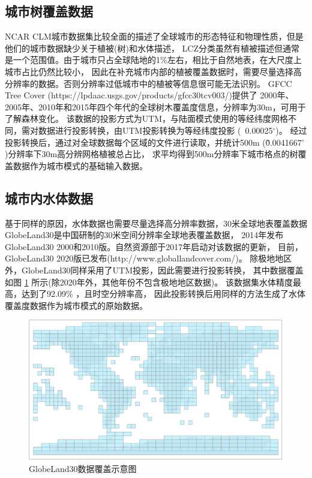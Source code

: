 \subsection{城市树覆盖数据}\label{城市树覆盖数据}
NCAR CLM城市数据集比较全面的描述了全球城市的形态特征和物理性质，但是他们的城市数据缺少关于植被(树)和水体描述，
LCZ分类虽然有植被描述但通常是一个范围值。由于城市只占全球陆地的1\%左右，相比于自然地表，在大尺度上城市占比仍然比较小，
因此在补充城市内部的植被覆盖数据时，需要尽量选择高分辨率的数据。否则分辨率过低城市中的植被等信息很可能无法识别。
GFCC Tree Cover (https://lpdaac.usgs.gov/products/gfcc30tcv003/)提供了
2000年、2005年、2010年和2015年四个年代的全球树木覆盖度信息，分辨率为30m，可用于了解森林变化。
该数据的投影方式为UTM，与陆面模式使用的等经纬度网格不同，需对数据进行投影转换，由UTM投影转换为等经纬度投影 (~0.00025$^\circ$)。
经过投影转换后，通过对全球数据每个区域的文件进行读取，并统计500m (\~0.0041667$^\circ$)分辨率下30m高分辨网格植被总占比，
求平均得到500m分辨率下城市格点的树覆盖数据作为城市模式的基础输入数据。
\subsection{城市内水体数据}\label{城市内水体数据}
基于同样的原因，水体数据也需要尽量选择高分辨率数据，30米全球地表覆盖数据GlobeLand30是中国研制的30米空间分辨率全球地表覆盖数据，
2014年发布GlobeLand30 2000和2010版。自然资源部于2017年启动对该数据的更新，
目前，GlobeLand30 2020版已发布(http://www.globallandcover.com/)。
除极地地区外，GlobeLand30同样采用了UTM投影，因此需要进行投影转换，
其中数据覆盖如图 \ref{fig:GlobeLand30数据覆盖示意图} 所示(除2020年外，其他年份不包含极地地区数据)。
该数据集水体精度最高，达到了92.09\% \citep{陈军2017}，且时空分辨率高，
因此投影转换后用同样的方法生成了水体覆盖度数据作为城市模式的原始数据。
{
\begin{figure}[]
\centering
\includegraphics{Figures/地表输入数据/GlobeLand30数据覆盖示意图.png}
\caption{GlobeLand30数据覆盖示意图}
\label{fig:GlobeLand30数据覆盖示意图}
\end{figure}
}

